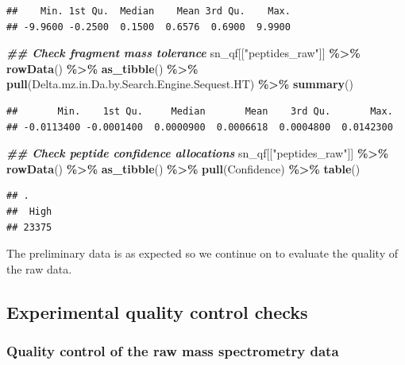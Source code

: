 \documentclass[9pt,a4paper,]{extarticle}
\newenvironment{Shaded}{\begin{snugshade}}{\end{snugshade}}
\newcommand{\DocumentationTok}[1]{\textcolor[rgb]{0.56,0.35,0.01}{\textbf{\textit{#1}}}}
\newcommand{\FunctionTok}[1]{\textcolor[rgb]{0.13,0.29,0.53}{\textbf{#1}}}
\newcommand{\NormalTok}[1]{#1}
\newcommand{\SpecialCharTok}[1]{\textcolor[rgb]{0.81,0.36,0.00}{\textbf{#1}}}
\newcommand{\StringTok}[1]{\textcolor[rgb]{0.31,0.60,0.02}{#1}}
\begin{document}
\begin{verbatim}
##    Min. 1st Qu.  Median    Mean 3rd Qu.    Max. 
## -9.9600 -0.2500  0.1500  0.6576  0.6900  9.9900
\end{verbatim}

\begin{Shaded}
\begin{Highlighting}[]
\DocumentationTok{\#\# Check fragment mass tolerance}
\NormalTok{sn\_qf[[}\StringTok{"peptides\_raw"}\NormalTok{]] }\SpecialCharTok{\%\textgreater{}\%}
  \FunctionTok{rowData}\NormalTok{() }\SpecialCharTok{\%\textgreater{}\%} 
  \FunctionTok{as\_tibble}\NormalTok{() }\SpecialCharTok{\%\textgreater{}\%} 
  \FunctionTok{pull}\NormalTok{(Delta.mz.in.Da.by.Search.Engine.Sequest.HT) }\SpecialCharTok{\%\textgreater{}\%} 
  \FunctionTok{summary}\NormalTok{()}
\end{Highlighting}
\end{Shaded}

\begin{verbatim}
##       Min.    1st Qu.     Median       Mean    3rd Qu.       Max. 
## -0.0113400 -0.0001400  0.0000900  0.0006618  0.0004800  0.0142300
\end{verbatim}

\begin{Shaded}
\begin{Highlighting}[]
\DocumentationTok{\#\# Check peptide confidence allocations}
\NormalTok{sn\_qf[[}\StringTok{"peptides\_raw"}\NormalTok{]] }\SpecialCharTok{\%\textgreater{}\%}
  \FunctionTok{rowData}\NormalTok{() }\SpecialCharTok{\%\textgreater{}\%} 
  \FunctionTok{as\_tibble}\NormalTok{() }\SpecialCharTok{\%\textgreater{}\%} 
  \FunctionTok{pull}\NormalTok{(Confidence) }\SpecialCharTok{\%\textgreater{}\%} 
  \FunctionTok{table}\NormalTok{()}
\end{Highlighting}
\end{Shaded}

\begin{verbatim}
## .
##  High 
## 23375
\end{verbatim}

The preliminary data is as expected so we continue on to evaluate the quality
of the raw data.

\subsection{Experimental quality control checks}\label{experimental-quality-control-checks-1}

\subsubsection{Quality control of the raw mass spectrometry data}\label{quality-control-of-the-raw-mass-spectrometry-data-1}
\end{document}
